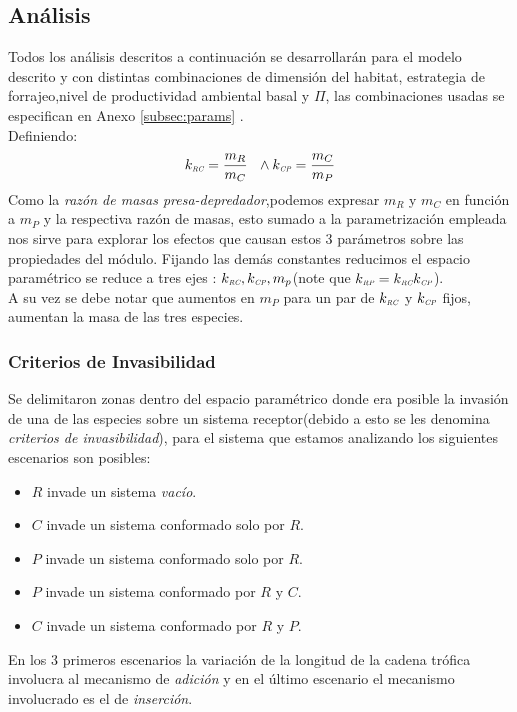 \subsection{An\'alisis}
Todos los an\'alisis descritos a continuaci\'on se desarrollar\'an para el modelo descrito y con distintas combinaciones de dimensi\'on del habitat, estrategia de forrajeo,nivel de productividad ambiental basal y $\Pi$, las combinaciones usadas se especifican en Anexo \ref{subsec:params} .\\
Definiendo:
\begin{equation}
  k_\RC = \frac{ m_R}{m_C} \ \ \land k_\CP = \frac{m_C}{m_P}
\end{equation}
Como la \emph{raz\'on de masas presa-depredador},podemos expresar $m_R$ y $m_C$ en funci\'on a $m_P$ y la respectiva raz\'on de masas, esto sumado a la parametrizaci\'on empleada nos sirve para explorar los efectos que causan estos 3 par\'ametros sobre las propiedades del m\'odulo. Fijando las dem\'as constantes reducimos el espacio param\'etrico se reduce a tres ejes : $k_{\textit{\tiny RC}},k_{\textit{\tiny CP}}, m_p$(note que $k_{\textit{\tiny RP}} = k_{\textit{\tiny RC}} k_{\textit{\tiny CP}}$). \\
A su vez se debe notar que aumentos en $m_P$ para un par de $k_{\textit{\tiny RC}}$ y $k_{\textit{\tiny CP}}$ fijos, aumentan la masa de las tres especies. 

\subsubsection{Criterios de Invasibilidad}\label{subsubsec:Inv}
Se delimitaron zonas dentro del espacio param\'etrico donde era posible la invasi\'on de una de las especies sobre un sistema receptor(debido a esto se les denomina \emph{criterios de invasibilidad}), para el sistema que estamos analizando los siguientes escenarios son posibles: 

\begin{itemize}
\item $R$ invade un sistema \emph{vac\'io}.
\item $C$ invade un sistema conformado solo por $R$.
\item $P$ invade un sistema conformado solo por $R$.
\item $P$ invade un sistema conformado por $R$ y $C$.
\item $C$ invade un sistema conformado por $R$ y $P$.
\end{itemize}
En los 3 primeros escenarios la variaci\'on de la longitud de la cadena tr\'ofica involucra al mecanismo de \textit{adici\'on} y en el \'ultimo escenario el mecanismo involucrado es el de \textit{inserci\'on}.\\


